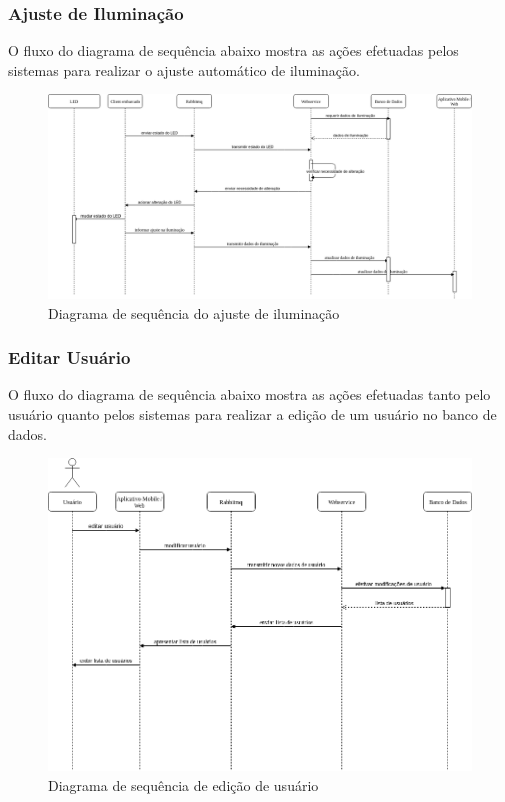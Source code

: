 \subsubsection{Ajuste de Iluminação}

O fluxo do diagrama de sequência abaixo mostra as ações efetuadas pelos sistemas para realizar o ajuste automático de iluminação.

\begin{figure}[H]
	\centering
		\includegraphics[width=16cm]{figuras/ajuste_iluminacao.png}
	\caption{Diagrama de sequência do ajuste de iluminação} \label{ajuste_iluminacao}
\end{figure}

\subsubsection{Editar Usuário}

O fluxo do diagrama de sequência abaixo mostra as ações efetuadas tanto pelo usuário quanto pelos sistemas para realizar a edição de um usuário no banco de dados.

\begin{figure}[H]
	\centering
	\includegraphics[width=18cm]{figuras/edicao_usuario.png}
	\caption{Diagrama de sequência de edição de usuário} \label{edicao_usuario}
\end{figure}


